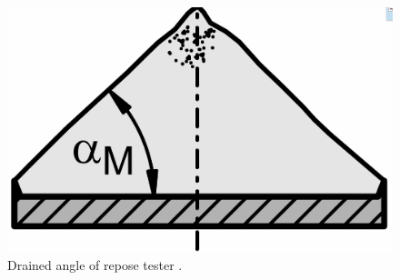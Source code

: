 \begin{figure}[!htb]
\centering
\includegraphics[width=.80\columnwidth]{images/005aor}
\caption[AoR tester]{Drained angle of repose tester \cite{RefWorks:69}.}
\label{fig:005aor}
\end{figure}